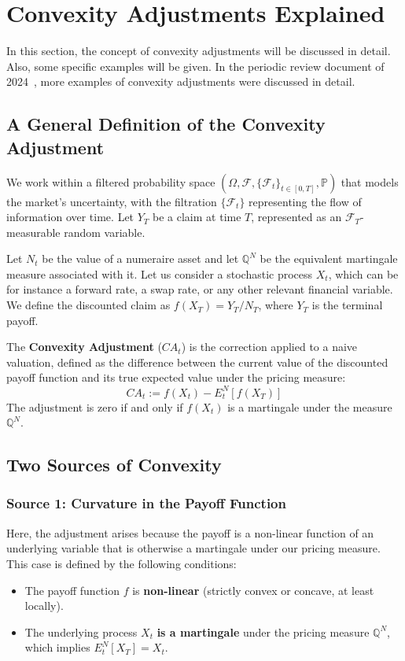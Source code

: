 \documentclass[reviewdoc]{pmv_report} %
\begin{document}
\section{Convexity Adjustments Explained}
\label{sec:explanation}
In this section, the concept of convexity adjustments will be discussed in detail.
Also, some specific examples will be given.
In the periodic review document of 2024~\cite{ReviewConvexityAdjustments2024}, more examples of convexity adjustments were discussed in detail.

\subsection{A General Definition of the Convexity Adjustment}
\label{sec:convexAdjDef}

We work within a filtered probability space $(\Omega, \mathcal{F}, \{\mathcal{F}_t\}_{t \in [0,T]}, \mathbb{P})$ that models the market's uncertainty, with the filtration $\{\mathcal{F}_t\}$ representing the flow of information over time. Let $Y_T$ be a claim at time $T$, represented as an $\mathcal{F}_T$-measurable random variable.

Let $N_t$ be the value of a numeraire asset and let $\mathbb{Q}^N$ be the equivalent martingale measure associated with it.
Let us consider a stochastic process $X_t$, which can be for instance a forward rate, a swap rate, or any other relevant financial variable.
We define the discounted claim as $f(X_T) = Y_T / N_T$, where $Y_T$ is the terminal payoff.

The \textbf{Convexity Adjustment} ($CA_t$) is the correction applied to a naive valuation, defined as the difference between the current value of the discounted payoff function and its true expected value under the pricing measure:
\begin{equation}
    \boxed{CA_t := f(X_t) - E^N_t \left[ f(X_T) \right]}
\end{equation}
The adjustment is zero if and only if $f(X_t)$ is a martingale under the measure $\mathbb{Q}^N$. 

\subsection{Two Sources of Convexity}

\subsubsection*{Source 1: Curvature in the Payoff Function}
Here, the adjustment arises because the payoff is a non-linear function of an underlying variable that is otherwise a martingale under our pricing measure.
This case is defined by the following conditions:
\begin{itemize}
    \item The payoff function $f$ is \textbf{non-linear} (strictly convex or concave, at least locally).
    \item The underlying process $X_t$ \textbf{is a martingale} under the pricing measure $\mathbb{Q}^N$, which implies $E^N_t [X_T] = X_t$.
\end{itemize}
\end{document}
